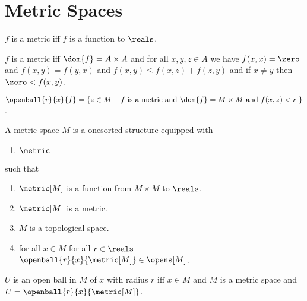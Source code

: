 



\section{Metric Spaces}

\begin{abbreviation}\label{metric}
    $f$ is a metric iff $f$ is a function to $\reals$.
\end{abbreviation}

\begin{axiom}\label{metric_axioms}
    $f$ is a metric iff $\dom{f} = A \times A$ and
    for all $x,y,z \in A$ we have 
        $f(x,x) = \zero$ and 
        $f(x,y) = f(y,x)$ and
        $f(x,y) \leq f(x,z) + f(z,y)$ and
        if $x \neq y$ then $\zero < f(x,y)$.
\end{axiom}

\begin{definition}\label{open_ball}
    $\openball{r}{x}{f} = \{z \in M \mid \text{ $f$ is a metric and $\dom{f} = M \times M$ and $f(x,z)<r$ } \}$.
\end{definition}


\begin{struct}\label{metric_space}  
    A metric space $M$ is a onesorted structure equipped with
    \begin{enumerate}
        \item $\metric$
    \end{enumerate}
    such that
    \begin{enumerate}
        \item \label{metric_space_d}                        $\metric[M]$ is a function from $M \times M$ to $\reals$.
        \item \label{metric_space_metric}                   $\metric[M]$ is a metric.
        \item \label{metric_space_topology}                 $M$ is a topological space.
        \item \label{metric_space_opens}                    for all $x \in M$ for all $r \in \reals$ $\openball{r}{x}{\metric[M]} \in \opens[M]$.
    \end{enumerate}
\end{struct}

\begin{abbreviation}\label{descriptive_syntax_for_openball1}
    $U$ is an open ball in $M$ of $x$ with radius $r$ iff $x \in M$ and $M$ is a metric space and $U = \openball{r}{x}{\metric[M]}$.
\end{abbreviation}

